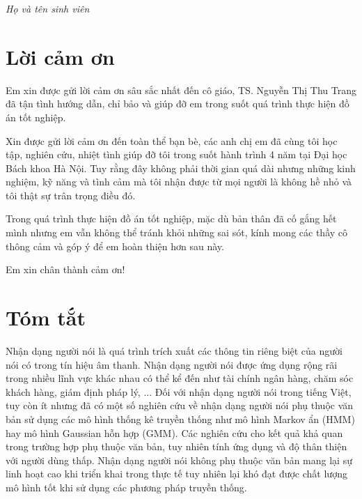 \documentclass[a4paper, 13pt, oneside]{report}
\begin{document}
    \begin{flushright}
        \begin{minipage}{0.45\textwidth} 
            \begin{center}
                \textit{Họ và tên sinh viên}
            \end{center}
        \end{minipage}
    \end{flushright}
    
    
\newpage
\chapter*{\centering Lời cảm ơn}

    Em xin được gửi lời cảm ơn sâu sắc nhất đến cô giáo, TS. Nguyễn Thị Thu Trang đã tận tình hướng dẫn, chỉ bảo và giúp đỡ em trong suốt quá trình thực hiện đồ án tốt nghiệp.
    
    Xin được gửi lời cảm ơn đến toàn thể bạn bè, các anh chị em đã cùng tôi học tập, nghiên cứu, nhiệt tình giúp đỡ tôi trong suốt hành trình 4 năm tại Đại học Bách khoa Hà Nội. Tuy rằng đây không phải thời gian quá dài nhưng những kinh nghiệm, kỹ năng và tình cảm mà tôi nhận được từ mọi người là không hề nhỏ và tôi thật sự trân trọng điều đó.
    
    Trong quá trình thực hiện đồ án tốt nghiệp, mặc dù bản thân đã cố gắng hết mình nhưng em vẫn không thể tránh khỏi những sai sót, kính mong các thầy cô thông cảm và góp ý để em hoàn thiện hơn sau này.
    
    Em xin chân thành cảm ơn!
\newpage

\chapter*{\centering Tóm tắt}

Nhận dạng người nói là quá trình trích xuất các thông tin riêng biệt của người nói có trong tín hiệu âm thanh. Nhận dạng người nói được ứng dụng rộng rãi trong nhiều lĩnh vực khác nhau có thể kể đến như tài chính ngân hàng, chăm sóc khách hàng, giám định pháp lý, ... Đối với nhận dạng người nói trong tiếng Việt, tuy còn ít nhưng đã có một số nghiên cứu về nhận dạng người nói phụ thuộc văn bản sử dụng các mô hình thống kê truyền thống như mô hình Markov ẩn (HMM) hay mô hình Gaussian hỗn hợp (GMM). Các nghiên cứu cho kết quả khả quan trong trường hợp phụ thuộc văn bản, tuy nhiên tính ứng dụng và độ thân thiện với người dùng thấp. Nhận dạng người nói không phụ thuộc văn bản mang lại sự linh hoạt cao khi triển khai trong thực tế tuy nhiên lại khó đạt được chất lượng mô hình tốt khi sử dụng các phương pháp truyền thống. 
\end{document}
